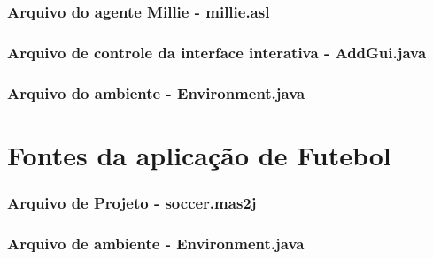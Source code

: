 \subsection*{Arquivo do agente Millie - millie.asl}


\subsection*{Arquivo de controle da interface interativa - AddGui.java}


%

\subsection*{Arquivo do ambiente - Environment.java}

\chapter{Fontes da aplicação de Futebol}

\subsection*{Arquivo de Projeto - soccer.mas2j} \label{adps}


\subsection*{Arquivo de ambiente - Environment.java}


%
%
%

